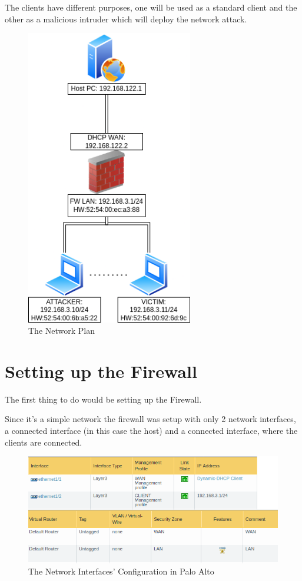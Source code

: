 The clients have different purposes, one will be used as a standard client and the other as a malicious intruder which will deploy the network attack.

\begin{figure}[h!]
 \centering
 \includegraphics[height=13cm]{img/Network_Plan.png}
 \caption{The Network Plan}
 \label{fig: network-plan}
\end{figure}



\newpage

\section{Setting up the Firewall}

The first thing to do would be setting up the Firewall.

Since it's a simple network the firewall was setup with only 2 network interfaces, a  connected interface (in this case the host) and a  connected interface, where the clients are connected.

\begin{figure}[!hb]
 \centering
 \includegraphics[width=13cm]{img/network_config.png}
 \caption{The Network Interfaces' Configuration in Palo Alto }
 \label{Network Interfaces Configuration}
\end{figure}


